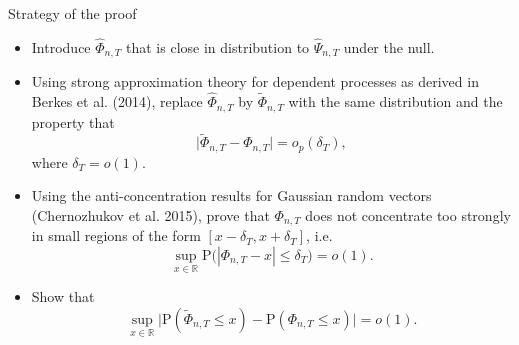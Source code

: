 \documentclass[10pt, handout]{beamer}
\newcommand{\Prob}{\mathrm{P}}
\begin{document}
\begin{frame}{Strategy of the proof}
\begin{itemize}
\item Introduce $\widehat{\Phi}_{n, T}$ that is close in distribution to $\widehat{\Psi}_{n, T}$ under the null.
\item Using strong approximation theory for dependent processes as derived in Berkes et al. (2014), replace $\widehat{\Phi}_{n, T}$ by $\widetilde{\Phi}_{n, T}$ with the same distribution and the property that 
\begin{equation*}\label{eq-theo-stat-strategy-step1}
\big| \widetilde{\Phi}_{n, T} - \Phi_{n, T} \big| = o_p(\delta_T),
\end{equation*}
where $\delta_T = o(1)$.\pause
\item Using the anti-concentration results for Gaussian random vectors (Chernozhukov et al. 2015), prove that $\Phi_{n, T}$ does not concentrate too strongly in small regions of the form $[x-\delta_T,x+\delta_T]$, i.e.
\begin{equation*}\label{eq-theo-stat-strategy-step2}
\sup_{x \in \mathbb{R}} \Prob \big( |\Phi_{n, T} - x| \le \delta_T \big) = o(1).
\end{equation*}\pause
\vspace{-2mm}
\item Show that 
\begin{equation*}\label{eq-theo-stat-strategy-claim}
\sup_{x \in \mathbb{R}} \big| \Prob(\widetilde{\Phi}_{n, T} \le x) - \Prob(\Phi_{n, T} \le x) \big| = o(1). 
\end{equation*}
\end{itemize}
\end{frame}
\end{document}
